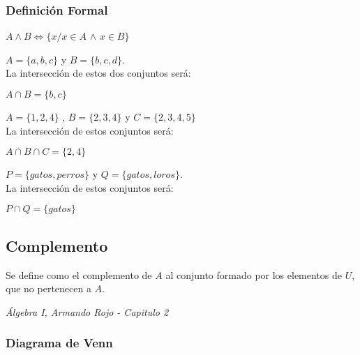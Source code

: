 \documentclass[12pt,a4paper]{book}
\newcommand*\ruleline[1]{\par\noindent\raisebox{.8ex}{\makebox[\linewidth]{\hrulefill\hspace{1ex}\raisebox{-.8ex}{#1}\hspace{1ex}\hrulefill}}}
\begin{document}
\subsubsection{Definición Formal}
\begin{center}
$A \wedge B \Leftrightarrow \lbrace x/x \in A$ $\wedge$ $x\in B \rbrace$ 
\end{center}

\ruleline{\textbf{Ejemplos}}
 $A = \lbrace a,b,c \rbrace$ y $B = \lbrace b,c,d \rbrace$.\\ La intersección de estos dos conjuntos será:
\begin{center}
$A \cap B = \lbrace b,c \rbrace$
\end{center}

 $A = \lbrace 1,2,4 \rbrace$ , $ B= \lbrace 2,3,4 \rbrace$ y $C = \lbrace 2,3,4,5 \rbrace$\\ La intersección de estos conjuntos será:
\begin{center}
$A \cap B \cap C = \lbrace 2,4 \rbrace$
\end{center}


 $P = \lbrace gatos,perros \rbrace$ y $ Q= \lbrace gatos,loros \rbrace$.\\ La intersección de estos conjuntos será:
\begin{center}
$P \cap Q= \lbrace gatos \rbrace$
\end{center}


\subsection{Complemento}
\begin{framed}\noindent
Se define como el complemento de $A$ al conjunto formado por los elementos de $U$, que no pertenecen a $A$.
\begin{flushright}
\textit{{\scriptsize Álgebra I, Armando Rojo - Capitulo 2}}
\end{flushright}
\vspace{-0.5cm}
\end{framed}

\subsubsection{Diagrama de Venn}
\begin{center}
\end{center}
\end{document}
